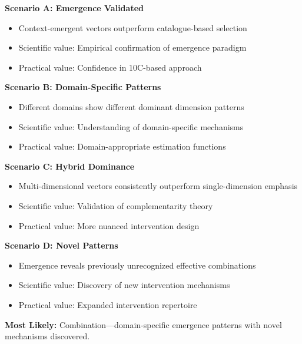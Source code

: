 \begin{tcolorbox}[colback=blue!5!white, colframe=blue!50!black,
    title=\textbf{Hypothetical Outcome: What Might We Discover?}]

\textbf{Scenario A: Emergence Validated}
\begin{itemize}[nosep]
    \item Context-emergent vectors outperform catalogue-based selection
    \item Scientific value: Empirical confirmation of emergence paradigm
    \item Practical value: Confidence in 10C-based approach
\end{itemize}

\textbf{Scenario B: Domain-Specific Patterns}
\begin{itemize}[nosep]
    \item Different domains show different dominant dimension patterns
    \item Scientific value: Understanding of domain-specific mechanisms
    \item Practical value: Domain-appropriate estimation functions
\end{itemize}

\textbf{Scenario C: Hybrid Dominance}
\begin{itemize}[nosep]
    \item Multi-dimensional vectors consistently outperform single-dimension emphasis
    \item Scientific value: Validation of complementarity theory
    \item Practical value: More nuanced intervention design
\end{itemize}

\textbf{Scenario D: Novel Patterns}
\begin{itemize}[nosep]
    \item Emergence reveals previously unrecognized effective combinations
    \item Scientific value: Discovery of new intervention mechanisms
    \item Practical value: Expanded intervention repertoire
\end{itemize}

\textbf{Most Likely:} Combination---domain-specific emergence patterns with novel mechanisms discovered.

\end{tcolorbox}


